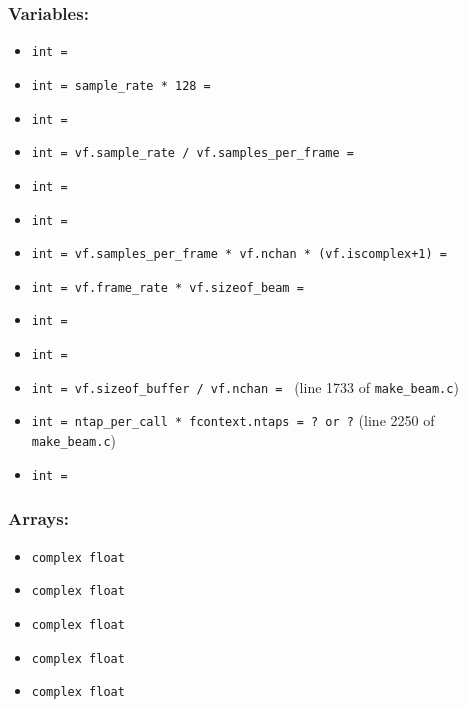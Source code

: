 \documentclass{article}
\begin{document}
\subsubsection*{Variables:}
\begin{itemize}
    \item \texttt{int  = }
    \item \texttt{int  = sample\_rate * 128 = }
    \item \texttt{int  = }
    \item \texttt{int  = vf.sample\_rate / vf.samples\_per\_frame = }
    \item \texttt{int  = }
    \item \texttt{int  = }
    \item \texttt{int  = vf.samples\_per\_frame * vf.nchan * (vf.iscomplex+1) = }
    \item \texttt{int  = vf.frame\_rate * vf.sizeof\_beam = }
    \item \texttt{int  = }
    \item \texttt{int  = }
    \item \texttt{int  = vf.sizeof\_buffer / vf.nchan = } (line 1733 of \texttt{make\_beam.c})
    \item \texttt{int  = ntap\_per\_call * fcontext.ntaps = ? or ?} (line 2250 of \texttt{make\_beam.c})
    \item \texttt{int  = }
\end{itemize}

\subsubsection*{Arrays:}
\begin{itemize}
    \item \texttt{complex float }
    \item \texttt{complex float }
    \item \texttt{complex float }
    \item \texttt{complex float }
    \item \texttt{complex float }
\end{itemize}
\end{document}
